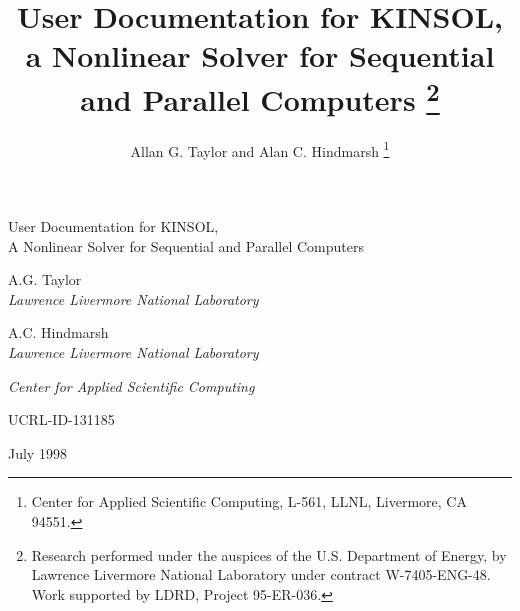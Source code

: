 



\setlength{\oddsidemargin}{0in}
\setlength{\evensidemargin}{0in}
\setlength{\textwidth}{6.5in}


\title{User Documentation for KINSOL, a Nonlinear Solver for Sequential and 
Parallel Computers%
\thanks{
Research performed under the auspices of the U.S.
Department of Energy, by Lawrence Livermore National Laboratory under
contract W-7405-ENG-48.  Work supported by LDRD, Project 95-ER-036.} }

\author{Allan G. Taylor and Alan C. Hindmarsh%
\thanks{Center for Applied Scientific Computing, L-561,
        LLNL, Livermore, CA 94551.} }



\thispagestyle{empty}


\vspace*{\fill}
\vspace*{0.1in}

\begin{center}

\LARGE
User Documentation for KINSOL, \\ A Nonlinear Solver for Sequential and Parallel Computers

\par\vspace*{0.7in}
\large
A.G. Taylor\\{\em Lawrence Livermore National Laboratory}
\par\bigskip

A.C. Hindmarsh\\{\em Lawrence Livermore National Laboratory}
\end{center}

\vfill
\mbox{}
\vfill
\vspace*{3.5in}


\par\Large\it Center for Applied Scientific Computing
\vspace*{0.7in}
\par\large UCRL-ID-131185
\par\large July 1998

\newpage
\thispagestyle{empty}



